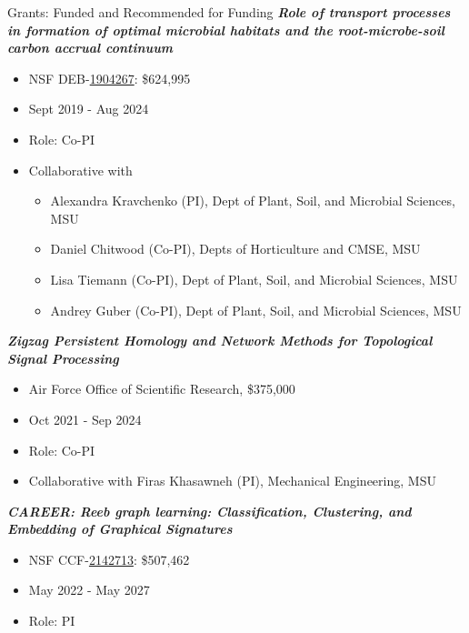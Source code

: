 \documentclass{resume} %
\begin{document}
\begin{rSection}{Grants: Funded and Recommended for Funding}
\textbf{\textit{Role of transport processes in formation of optimal microbial habitats and the root-microbe-soil carbon accrual continuum}}
\vspace{-.1in}
\begin{itemize}{}{\leftmargin=0em}
   \itemsep -0.6em %
   \item
NSF DEB-\href{https://nsf.gov/awardsearch/showAward?AWD_ID=1904267}{1904267}: \$624,995
\item
Sept 2019 - Aug 2024
   \item
Role: Co-PI
\item Collaborative with
   \vspace{-.1in}
\begin{itemize}{}{\leftmargin=0em}
   \itemsep -0.6em %
  \item Alexandra Kravchenko (PI),  Dept of Plant, Soil, and Microbial Sciences, MSU
  \item Daniel Chitwood (Co-PI), Depts of Horticulture and CMSE, MSU
  \item Lisa Tiemann (Co-PI), Dept of Plant, Soil, and Microbial Sciences, MSU
  \item Andrey Guber (Co-PI), Dept of Plant, Soil, and Microbial Sciences, MSU
\end{itemize}
\end{itemize}
\textbf{\textit{Zigzag Persistent Homology and Network Methods for Topological Signal Processing}}
\vspace{-.1in}
\begin{itemize}{}{\leftmargin=0em}
   \itemsep -0.6em %
   \item Air Force Office of Scientific Research, \$375,000
\item
Oct 2021 - Sep 2024
   \item
Role: Co-PI
\item Collaborative with Firas Khasawneh (PI), Mechanical Engineering, MSU

\end{itemize}
\textbf{\textit{CAREER: Reeb graph learning: Classification, Clustering, and Embedding of Graphical Signatures
}}
\vspace{-.1in}
\begin{itemize}{}{\leftmargin=0em}
   \itemsep -0.6em %
   \item NSF CCF-\href{https://nsf.gov/awardsearch/showAward?AWD_ID=2142713}{2142713}:  \$507,462
\item
May 2022 - May 2027
   \item
Role: PI


\end{itemize}
\end{rSection}
\end{document}
